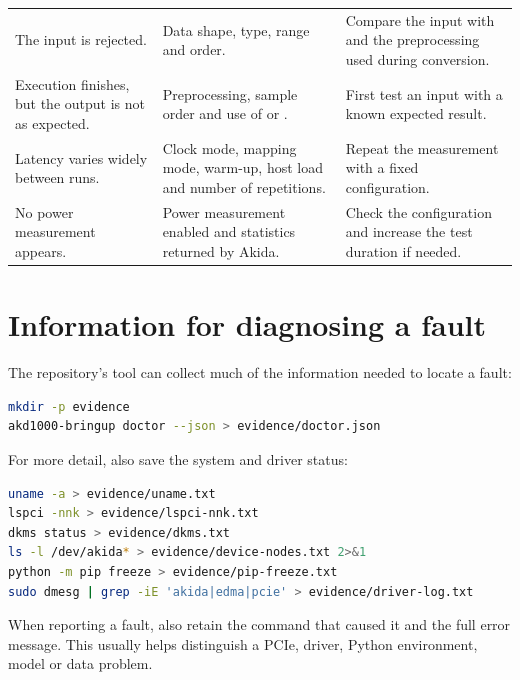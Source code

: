 \begin{longtable}{@{}L{0.25\textwidth}L{0.34\textwidth}L{0.33\textwidth}@{}}
The input is rejected. &
Data shape, type, range and order. &
Compare the input with  and the preprocessing used during conversion. \\

Execution finishes, but the output is not as expected. &
Preprocessing, sample order and use of  or . &
First test an input with a known expected result. \\

Latency varies widely between runs. &
Clock mode, mapping mode, warm-up, host load and number of repetitions. &
Repeat the measurement with a fixed configuration. \\

No power measurement appears. &
Power measurement enabled and statistics returned by Akida. &
Check the configuration and increase the test duration if needed. \\

\bottomrule
\end{longtable}

\section{Information for diagnosing a fault}

The repository's tool can collect much of the information needed to locate a fault:

\begin{lstlisting}[language=bash]
mkdir -p evidence
akd1000-bringup doctor --json > evidence/doctor.json
\end{lstlisting}

For more detail, also save the system and driver status:

\begin{lstlisting}[language=bash]
uname -a > evidence/uname.txt
lspci -nnk > evidence/lspci-nnk.txt
dkms status > evidence/dkms.txt
ls -l /dev/akida* > evidence/device-nodes.txt 2>&1
python -m pip freeze > evidence/pip-freeze.txt
sudo dmesg | grep -iE 'akida|edma|pcie' > evidence/driver-log.txt
\end{lstlisting}

When reporting a fault, also retain the command that caused it and the full error
message. This usually helps distinguish a PCIe, driver, Python environment, model
or data problem.
